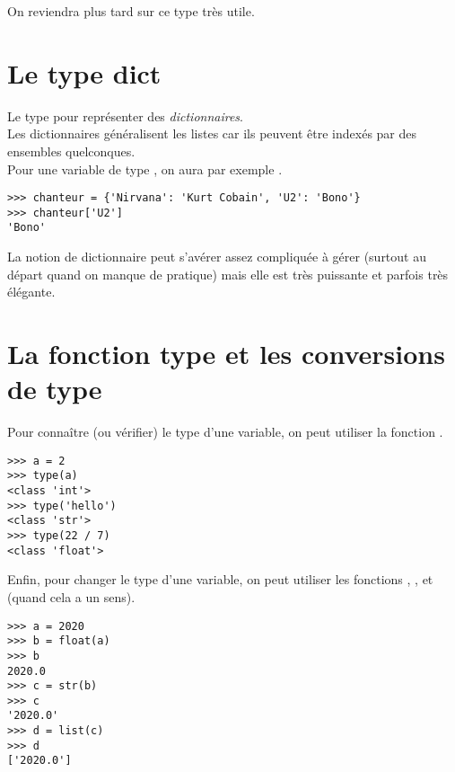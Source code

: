 On reviendra plus tard sur ce type très utile.

\section{Le type dict}
Le type  pour représenter des \textit{dictionnaires}.\\
Les dictionnaires généralisent les listes car ils peuvent être indexés par des ensembles quelconques.\\
Pour une variable  de type , on aura par exemple .

\begin{pys}\begin{verbatim}
>>> chanteur = {'Nirvana': 'Kurt Cobain', 'U2': 'Bono'}
>>> chanteur['U2']
'Bono'
\end{verbatim}
\end{pys}


La notion de dictionnaire peut s'avérer assez compliquée à gérer (surtout au départ quand on manque de pratique) mais elle est très puissante et parfois très élégante.\\

\section{La fonction type et les conversions de type}

Pour connaître (ou vérifier) le type d'une variable, on peut utiliser la fonction .

\begin{pys}\begin{verbatim}
>>> a = 2
>>> type(a)
<class 'int'>
>>> type('hello')
<class 'str'>
>>> type(22 / 7)
<class 'float'>
\end{verbatim}
\end{pys}


Enfin, pour changer le type d'une variable, on peut utiliser les fonctions , ,  et  (quand cela a un sens).

\begin{pys}\begin{verbatim}
>>> a = 2020
>>> b = float(a)
>>>	b
2020.0
>>> c = str(b)
>>> c
'2020.0'
>>> d = list(c)
>>> d
['2020.0']
\end{verbatim}
\end{pys}

